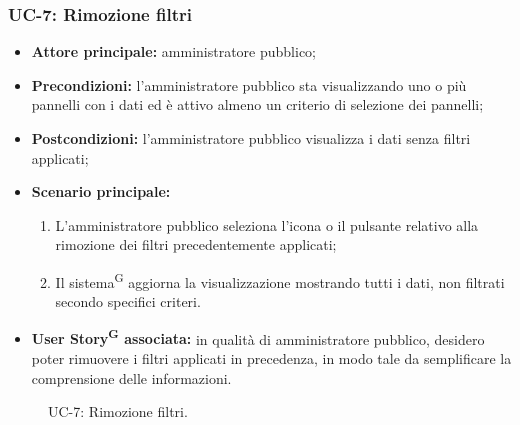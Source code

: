 \documentclass[8pt]{article}
\newcommand{\glossterm}[1]{#1\textsuperscript{G}} %
\begin{document}
\subsubsection*{UC-7: Rimozione filtri}
\begin{itemize}
    \item \textbf{Attore principale:} amministratore pubblico;
    \item \textbf{Precondizioni:} l’amministratore pubblico sta visualizzando uno o più pannelli con i dati ed è attivo almeno un criterio di selezione dei pannelli;
    \item \textbf{Postcondizioni:} l’amministratore pubblico visualizza i dati senza filtri applicati;
    \item \textbf{Scenario principale:}
        \begin{enumerate}
        \item L’amministratore pubblico seleziona l’icona o il pulsante relativo alla rimozione dei filtri precedentemente applicati;
        \item Il \glossterm{sistema} aggiorna la visualizzazione mostrando tutti i dati, non filtrati secondo specifici criteri.
        \end{enumerate}
    \item \textbf{\glossterm{User Story} associata:} in qualità di amministratore pubblico, desidero poter rimuovere i filtri applicati in precedenza, in modo tale da semplificare la comprensione delle informazioni.
\end{itemize}
\begin{figure}[ht!]
    \centering
    \caption{UC-7: Rimozione filtri.}
    \label{fig:UC-7: Rimozione filtri}
\end{figure}
\end{document}
